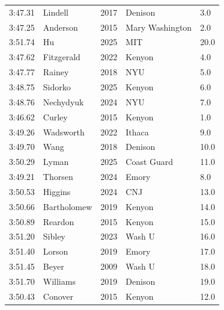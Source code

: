 \begin{table}[H]
\begin{minipage}[t]{0.48\textwidth}
\begin{tabular}{@{}p{1.8cm}p{2.8cm}p{1.2cm}p{1.4cm}p{0.8cm}@{}}
\hline
    3:47.31 & Lindell & 2017 & Denison & 3.0 \\
    3:47.25 & Anderson & 2015 & Mary Washington & 2.0 \\
    3:51.74 & Hu & 2025 & MIT & 20.0 \\
    3:47.62 & Fitzgerald & 2022 & Kenyon & 4.0 \\
    3:47.77 & Rainey & 2018 & NYU & 5.0 \\
    3:48.75 & Sidorko & 2025 & Kenyon & 6.0 \\
    3:48.76 & Nechydyuk & 2024 & NYU & 7.0 \\
    3:46.62 & Curley & 2015 & Kenyon & 1.0 \\
    3:49.26 & Wadsworth & 2022 & Ithaca & 9.0 \\
    3:49.70 & Wang & 2018 & Denison & 10.0 \\
    3:50.29 & Lyman & 2025 & Coast Guard & 11.0 \\
    3:49.21 & Thorsen & 2024 & Emory & 8.0 \\
    3:50.53 & Higgins & 2024 & CNJ & 13.0 \\
    3:50.66 & Bartholomew & 2019 & Kenyon & 14.0 \\
    3:50.89 & Reardon & 2015 & Kenyon & 15.0 \\
    3:51.20 & Sibley & 2023 & Wash U & 16.0 \\
    3:51.40 & Lorson & 2019 & Emory & 17.0 \\
    3:51.45 & Beyer & 2009 & Wash U & 18.0 \\
    3:51.70 & Williams & 2019 & Denison & 19.0 \\
    3:50.43 & Conover & 2015 & Kenyon & 12.0 \\
\hline
\end{tabular}
\end{minipage}
\end{table}

